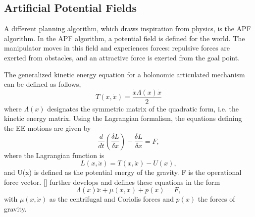\subsection{Artificial Potential Fields} \label{subsec:APF}
A different planning algorithm, which draws inspiration from physics, is the \gls{APF} algorithm. In the \gls{APF} algorithm, a potential field is defined for the world. The manipulator moves in this field and experiences forces: repulsive forces are exerted from obstacles, and an attractive force is exerted from the goal point. 

The generalized kinetic energy equation for a holonomic articulated mechanism can be defined as follows,
\begin{equation}
	T(x, \dot{x}) = \frac{\dot{x}\Lambda(x)\dot{x}}{2}
\end{equation}
where $\Lambda(x)$ designates the symmetric matrix of the quadratic form, i.e. the kinetic energy matrix. Using the Lagrangian formalism, the equations defining the \gls{EE} motions are given by
\begin{equation}
	\frac{d}{dt}\left(\frac{\delta L}{\delta x}\right) - \frac{\delta L}{\delta x} = F,
\end{equation}
where the Lagrangian function is
\begin{equation} \label{eq:Lagr}
	L(x,\dot{x}) = T(x, \dot{x}) - U(x),
\end{equation}
and U(x) is defined as the potential energy of the gravity. F is the operational force vector. [\citeauthor{Khatib}] further develops and defines these equations in the form
\begin{equation}
	\Lambda(x)\ddot{x} + \mu(x, \dot{x}) + p(x) = F,
	\label{eq:Khatib4}
\end{equation}
with $\mu(x,\dot{x})$ as the centrifugal and Coriolis forces and $p(x)$ the forces of gravity.


